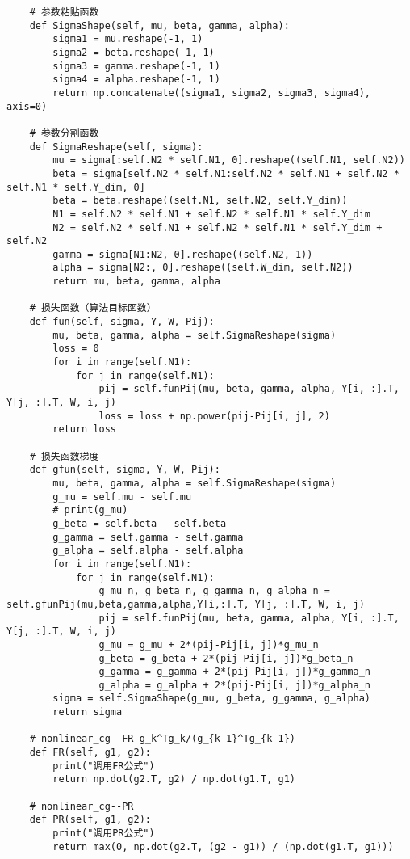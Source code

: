 \begin{lstlisting}
    # 参数粘贴函数
    def SigmaShape(self, mu, beta, gamma, alpha):
        sigma1 = mu.reshape(-1, 1)
        sigma2 = beta.reshape(-1, 1)
        sigma3 = gamma.reshape(-1, 1)
        sigma4 = alpha.reshape(-1, 1)
        return np.concatenate((sigma1, sigma2, sigma3, sigma4), axis=0)

    # 参数分割函数
    def SigmaReshape(self, sigma):
        mu = sigma[:self.N2 * self.N1, 0].reshape((self.N1, self.N2))
        beta = sigma[self.N2 * self.N1:self.N2 * self.N1 + self.N2 * self.N1 * self.Y_dim, 0]
        beta = beta.reshape((self.N1, self.N2, self.Y_dim))
        N1 = self.N2 * self.N1 + self.N2 * self.N1 * self.Y_dim
        N2 = self.N2 * self.N1 + self.N2 * self.N1 * self.Y_dim + self.N2
        gamma = sigma[N1:N2, 0].reshape((self.N2, 1))
        alpha = sigma[N2:, 0].reshape((self.W_dim, self.N2))
        return mu, beta, gamma, alpha

    # 损失函数（算法目标函数）
    def fun(self, sigma, Y, W, Pij):
        mu, beta, gamma, alpha = self.SigmaReshape(sigma)
        loss = 0
        for i in range(self.N1):
            for j in range(self.N1):
                pij = self.funPij(mu, beta, gamma, alpha, Y[i, :].T, Y[j, :].T, W, i, j)
                loss = loss + np.power(pij-Pij[i, j], 2)
        return loss

    # 损失函数梯度
    def gfun(self, sigma, Y, W, Pij):
        mu, beta, gamma, alpha = self.SigmaReshape(sigma)
        g_mu = self.mu - self.mu
        # print(g_mu)
        g_beta = self.beta - self.beta
        g_gamma = self.gamma - self.gamma
        g_alpha = self.alpha - self.alpha
        for i in range(self.N1):
            for j in range(self.N1):
                g_mu_n, g_beta_n, g_gamma_n, g_alpha_n = self.gfunPij(mu,beta,gamma,alpha,Y[i,:].T, Y[j, :].T, W, i, j)
                pij = self.funPij(mu, beta, gamma, alpha, Y[i, :].T, Y[j, :].T, W, i, j)
                g_mu = g_mu + 2*(pij-Pij[i, j])*g_mu_n
                g_beta = g_beta + 2*(pij-Pij[i, j])*g_beta_n
                g_gamma = g_gamma + 2*(pij-Pij[i, j])*g_gamma_n
                g_alpha = g_alpha + 2*(pij-Pij[i, j])*g_alpha_n
        sigma = self.SigmaShape(g_mu, g_beta, g_gamma, g_alpha)
        return sigma

    # nonlinear_cg--FR g_k^Tg_k/(g_{k-1}^Tg_{k-1})
    def FR(self, g1, g2):
        print("调用FR公式")
        return np.dot(g2.T, g2) / np.dot(g1.T, g1)

    # nonlinear_cg--PR
    def PR(self, g1, g2):
        print("调用PR公式")
        return max(0, np.dot(g2.T, (g2 - g1)) / (np.dot(g1.T, g1)))


\end{lstlisting}
